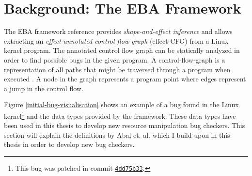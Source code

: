 \section{Background: The EBA Framework}
The EBA framework reference provides \textit{shape-and-effect inference} and allows extracting an \textit{effect-annotated control flow graph} (effect-CFG) from a Linux kernel program. The annotated control flow graph can be statically analyzed in order to find possible bugs in the given program. A control-flow-graph is a representation of all paths that might be traversed through a program when executed \cite{cfg}. A node in the graph represents a program point where edges represent a jump in the control flow. 

\newpar Figure \ref{initial-bug-visualisation} shows an example of a bug found in the Linux kernel\footnote{This bug was patched in commit \href{https://github.com/torvalds/linux/commit/4dd75b33}{\texttt{4dd75b33}}.} and the data types provided by the framework. These data types have been used in this thesis to develop new resource manipulation bug checkers. This section will explain the definitions by Abal et. al. \cite{Abal2017EffectiveBF} which I build upon in this thesis in order to develop new bug checkers. 

